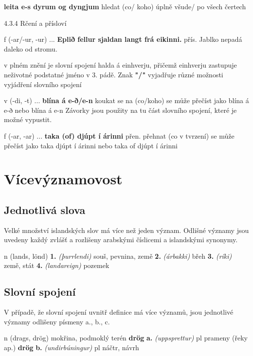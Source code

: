 \textbf{leita e-s dyrum og dyngjum} {hledat (co/ koho) úplně všude/ po všech čertech}

4.3.4	 Rčení a přísloví 

 {\small{ f (-ar/-ur, -ur)}
...
\textbf{Eplið fellur sjaldan langt frá eikinni.} \footnotesize{přís.} {Jablko nepadá daleko od stromu.}}

v plném znění je slovní spojení  halda á einhverju, přičemž einhverju zastupuje neživotné podstatné jméno v 3. pádě.
Znak \textbf{"/"} vyjadřuje různé možnosti vyjádření slovního spojení

 {\small{ v (-di, -t)}
...
\textbf{blína á e-ð/e-n} {koukat se na (co/koho)} }
se může přečíst jako blína á e-ð nebo blína á e-n
Závorky jsou použity na tu část slovního spojení, které je možné vypustit.
	
 {\small{ f (-ar, -ar) }
...
\textbf{taka (of) djúpt í árinni} \footnotesize{přen.} {přehnat (co v tvrzení)}}
se může přečíst jako taka djúpt í árinni nebo taka of djúpt í árinni

\section{Vícevýznamovost}

\subsection{Jednotlivá slova}
Velké množství islandských slov má více než jeden význam. Odlišné významy jsou uvedeny každý zvlášť a rozlišeny arabskými číslicemi a islandskými synonymy. 

 {\small{ n (lands, lönd) }
\textbf{1.} \textit{(þurrlendi)} {souš, pevnina, země} 
\textbf{2.} \textit{(árbakki)} {břeh }
\textbf{3.} \textit{(ríki)} {země, stát }
\textbf{4.} \textit{(landareign)} {pozemek} }

\subsection{Slovní spojení}
V případě, že slovní spojení uvnitř definice má více významů, jsou jednotlivé významy odlišeny písmeny a., b., c.

 {\small{ n (drags, drög) }
{mokřina, podmoklý terén} 
\textbf{drög}\textbf{ a.} \textit{(uppsprettur)} {\small{ pl}} {prameny (řeky ap.)} 
\textbf{drög} \textbf{b.} \textit{(undirbúningur)} {\small{ pl }}{náčtr, návrh}}

